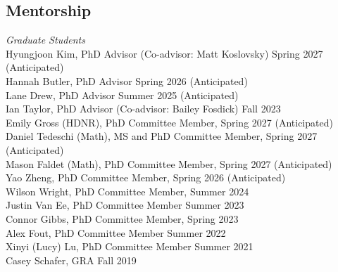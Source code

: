 \documentclass[margin,line]{res}
\begin{document}
\begin{resume}
% 

\section{\sc Mentorship}

{\em Graduate Students} \hfill \\
Hyungjoon Kim, PhD Advisor (Co-advisor: Matt Koslovsky) \hfill Spring 2027 (Anticipated) \\
Hannah Butler, PhD Advisor \hfill Spring 2026 (Anticipated) \\
Lane Drew, PhD Advisor \hfill Summer 2025 (Anticipated) \\
Ian Taylor, PhD Advisor (Co-advisor: Bailey Fosdick) \hfill Fall 2023 \\
Emily Gross (HDNR), PhD Committee Member, \hfill Spring 2027 (Anticipated) \\
Daniel Tedeschi (Math), MS and PhD Committee Member, \hfill Spring 2027 (Anticipated) \\
Mason Faldet (Math), PhD Committee Member, \hfill Spring 2027 (Anticipated) \\
Yao Zheng, PhD Committee Member, \hfill Spring 2026 (Anticipated) \\ 
Wilson Wright, PhD Committee Member, \hfill Summer 2024 \\
Justin Van Ee, PhD Committee Member \hfill Summer 2023 \\
Connor Gibbs, PhD Committee Member, \hfill Spring 2023  \\
Alex Fout, PhD Committee Member \hfill Summer 2022 \\
Xinyi (Lucy) Lu, PhD Committee Member \hfill Summer 2021 \\
Casey Schafer, GRA \hfill Fall 2019 \\




\end{resume}
\end{document}
